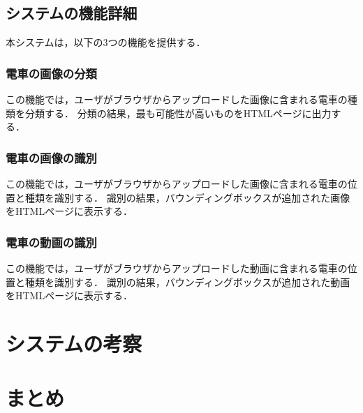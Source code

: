 \begin{multicols*}{2}
\subsection{システムの機能詳細} 本システムは，以下の3つの機能を提供する．
\subsubsection{電車の画像の分類} この機能では，ユーザがブラウザからアップロードした画像に含まれる電車の種類を分類する． 分類の結果，最も可能性が高いものをHTMLページに出力する．
\subsubsection{電車の画像の識別} この機能では，ユーザがブラウザからアップロードした画像に含まれる電車の位置と種類を識別する．  識別の結果，バウンディングボックスが追加された画像をHTMLページに表示する．
\subsubsection{電車の動画の識別} この機能では，ユーザがブラウザからアップロードした動画に含まれる電車の位置と種類を識別する． 識別の結果，バウンディングボックスが追加された動画をHTMLページに表示する．



\section{システムの考察}

\section{まとめ}





\end{multicols*} 


